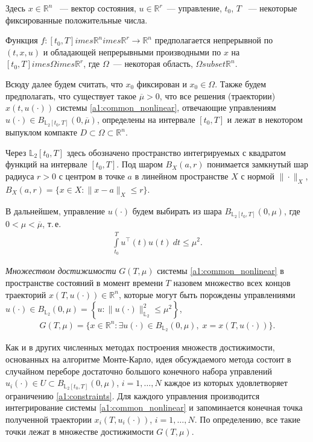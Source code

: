 \documentclass[../main.tex]{subfiles}
\begin{document}
  Здесь $ x \in \mathbb{R}^n $ ~--- вектор состояния, $ u \in \mathbb{R}^r $~--- управление,  $t_0$, $ {T} $ ~--- некоторые фиксированные положительные числа.
  
  Функция $ f: [t_0, {T}] 	imes  \mathbb{R}^n 	imes \mathbb{R}^r \rightarrow \mathbb{R}^{n} $ предполагается непрерывной по $(t,x,u)$ и обладающей непрерывными производными по $ x $ на  $ [t_0, {T}] 	imes \Omega 	imes \mathbb{R}^r $, где $\Omega$~--- некоторая область, $\Omega 
subset \mathbb{R}^n$.  
  
  Всюду далее будем считать, что $x_0$ фиксирован и  $x_0 \in  \Omega $.
  Также будем предполагать, что существует такое $\overline{\mu} > 0 $, что все решения (траектории) $ x(t, u(\cdot)) $ системы \eqref{a1:common_nonlinear}, отвечающие управлениям $u(\cdot) \in B_{\mathbb{L}_2[t_0, {T}]}(0,\overline{\mu})$,  определены на интервале $ [t_0,{T}] $ и лежат в некотором выпуклом компакте $D \subset \Omega \subset \mathbb{R}^n$. 
  
  Через $\mathbb{L}_2[t_0, {T}]$ здесь обозначено пространство интегрируемых с квадратом функций на интервале $[t_0, {T}]$. 
  Под шаром $B_X(a,r)$ понимается замкнутый шар радиуса $r>0$ с центром в точке $a$ в линейном пространстве $X$ с нормой $\|\cdot\|_X$, $B_X(a, r) = \{x\in X: \|x-a\|_X \leqslant r \}$.
  
  В дальнейшем, управление $ u(\cdot) $ будем выбирать из шара $ B_{\mathbb{L}_2[t_0, {T}]}(0,\mu) $, где $ 0 < \mu < \overline{\mu} $, т.\,е.
  \begin{gather}\label{a1:constraints}
  	\int\limits_{t_0}^T u^{\top}(t) u(t) \ dt \leqslant \mu^2.
  \end{gather}
  
  {\sl Множеством достижимости } $ G(T,\mu) $ системы \eqref{a1:common_nonlinear} в пространстве состояний в момент времени $ T $ назовем множество всех концов траекторий $ x(T, u(\cdot)) \in \mathbb{R}^n $,  которые могут быть порождены управлениями $ u(\cdot) \in B_{\mathbb{L}_2}(0,\mu) =\left\lbrace u:\lVert u(\cdot)\rVert^2_{\mathbb{L}_2} \leqslant \mu^2\right\rbrace  $,
  \begin{gather*}
  	G(T,\mu)=\{x\in \mathbb{R}^n:\exists u(\cdot)\in B_{\mathbb{L}_2}(0,\mu),\; x=x(T,u(\cdot))\}.
  \end{gather*}
  
  Как и в других численных методах построения множеств достижимости, основанных на алгоритме Монте-Карло, идея обсуждаемого метода состоит в случайном переборе достаточно большого конечного набора управлений $u_i(\cdot) \in U \subset B_{\mathbb{L}_2[t_0, {T}]}(0,\mu) $, $ i = 1, \dots, N$ каждое из которых удовлетворяет ограничению \eqref{a1:constraints}.
  Для каждого управления производится интегрирование системы \eqref{a1:common_nonlinear} и запоминается конечная точка полученной траектории $x_i(T, u_i(\cdot))$, $ i = 1, \dots, N$. 
  По определению, все такие точки лежат в множестве достижимости $G(T,\mu)$.
  
\end{document}
